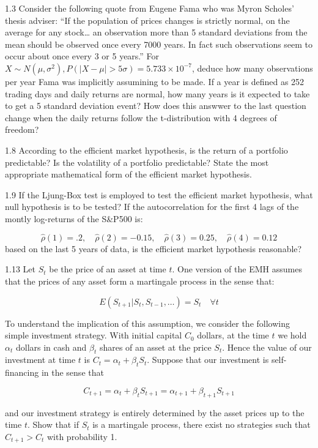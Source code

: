 \documentclass[11pt,]{article}
\begin{document}
1.3 Consider the following quote from Eugene Fama who was Myron Scholes'
thesis adviser: ``If the population of prices changes is strictly
normal, on the average for any stock\ldots{} an observation more than 5
standard deviations from the mean should be observed once every 7000
years. In fact such observations seem to occur about once every 3 or 5
years.'' For
\(X \sim N(\mu, \sigma^2), P(|X-\mu| > 5\sigma) = 5.733 \times 10^{-7}\),
deduce how many observations per year Fama was implicitly assumining to
be made. If a year is defined as 252 trading days and daily returns are
normal, how many years is it expected to take to get a 5 standard
deviation event? How does this answwer to the last question change when
the daily returns follow the t-distribution with 4 degrees of freedom?

1.8 According to the efficient market hypothesis, is the return of a
portfolio predictable? Is the volatility of a portfolio predictable?
State the most appropriate mathematical form of the efficient market
hypothesis.

1.9 If the Ljung-Box test is employed to test the efficient market
hypothesis, what null hypothesis is to be tested? If the autocorrelation
for the first 4 lags of the montly log-returns of the S\&P500 is:

\[
\hat{\rho}(1) = .2, \quad \hat{\rho}(2) = -0.15, \quad \hat{\rho}(3) = 0.25, \quad \hat{\rho}(4) = 0.12
\] based on the last 5 years of data, is the efficient market hypothesis
reasonable?

1.13 Let \(S_t\) be the price of an asset at time \(t\). One version of
the EMH assumes that the prices of any asset form a martingale process
in the sense that:

\[
E(S_{t+1}|S_t, S_{t-1}, \ldots ) = S_t \quad \forall t
\]

To understand the implication of this assumption, we consider the
following simple investment strategy. With initial capital \(C_0\)
dollars, at the time \(t\) we hold \(\alpha_t\) dollars in cash and
\(\beta_t\) shares of an asset at the price \(S_t\). Hence the value of
our investment at time \(t\) is \(C_t=\alpha_t + \beta_t S_t\). Suppose
that our investment is self-financing in the sense that

\[
C_{t+1} = \alpha_t + \beta_t S_{t+1} = \alpha_{t+1} + \beta_{t+1} S_{t+1}
\]

and our investment strategy is entirely determined by the asset prices
up to the time \(t\). Show that if \(S_t\) is a martingale process,
there exist no strategies such that \(C_{t+1} > C_t\) with probability
1.
\newpage
\singlespacing 
\end{document}
